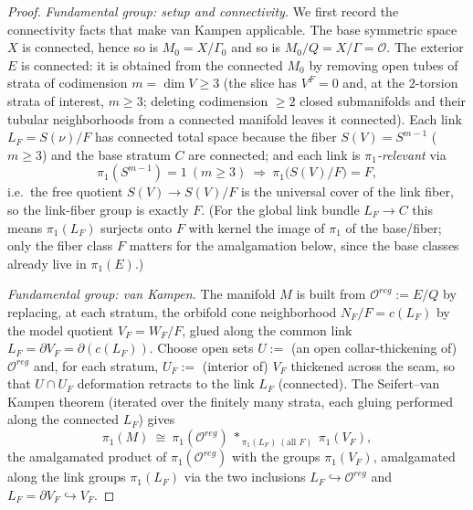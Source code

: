 \documentclass[12pt]{article}
\theoremstyle{definition}
\begin{document}
\begin{proof}
\emph{Fundamental group: setup and connectivity.} We first record the connectivity
facts that make van Kampen applicable. The base symmetric space $X$ is connected,
hence so is $M_0=X/\Gamma_0$ and so is $M_0/Q=X/\Gamma=\mathcal O$. The exterior
$E$ is connected: it is obtained from the connected $M_0$ by removing open tubes
of strata of codimension $m=\dim V\ge 3$ (the slice has $V^F=0$ and, at the
$2$-torsion strata of interest, $m\ge3$; deleting codimension $\ge 2$ closed
submanifolds and their tubular neighborhoods from a connected manifold leaves it
connected). Each link $L_F=S(\nu)/F$ has connected total space because the fiber
$S(V)=S^{m-1}$ ($m\ge3$) and the base stratum $C$ are connected; and each link is
\emph{$\pi_1$-relevant} via
\begin{equation}\label{eq:linkgroup}
   \pi_1(S^{m-1})=1\ (m\ge3)\ \Longrightarrow\ \pi_1\big(S(V)/F\big)=F,
\end{equation}
i.e.\ the free quotient $S(V)\to S(V)/F$ is the universal cover of the link fiber,
so the link-fiber group is exactly $F$. (For the global link bundle $L_F\to C$
this means $\pi_1(L_F)$ surjects onto $F$ with kernel the image of $\pi_1$ of the
base/fiber; only the fiber class $F$ matters for the amalgamation below, since the
base classes already live in $\pi_1(E)$.)

\emph{Fundamental group: van Kampen.} The manifold $M$ is built from $\mathcal
O^{reg}:=E/Q$ by replacing, at each stratum, the orbifold cone neighborhood
$N_F/F=c(L_F)$ by the model quotient $V_F=W_F/F$, glued along the common link
$L_F=\partial V_F=\partial(c(L_F))$. Choose open sets
$U:=$ (an open collar-thickening of) $\mathcal O^{reg}$ and, for each stratum,
$U_F:=$ (interior of) $V_F$ thickened across the seam, so that $U\cap U_F$
deformation retracts to the link $L_F$ (connected). The Seifert--van Kampen
theorem (iterated over the finitely many strata, each gluing performed along the
connected $L_F$) gives
\begin{equation}\label{eq:vk-M}
   \pi_1(M)\ \cong\ \pi_1(\mathcal O^{reg})\ *_{\,\pi_1(L_F)\ (\text{all }F)}\
   \pi_1(V_F),
\end{equation}
the amalgamated product of $\pi_1(\mathcal O^{reg})$ with the groups $\pi_1(V_F)$,
amalgamated along the link groups $\pi_1(L_F)$ via the two inclusions
$L_F\hookrightarrow\mathcal O^{reg}$ and $L_F=\partial V_F\hookrightarrow V_F$.


\end{proof}
\end{document}
